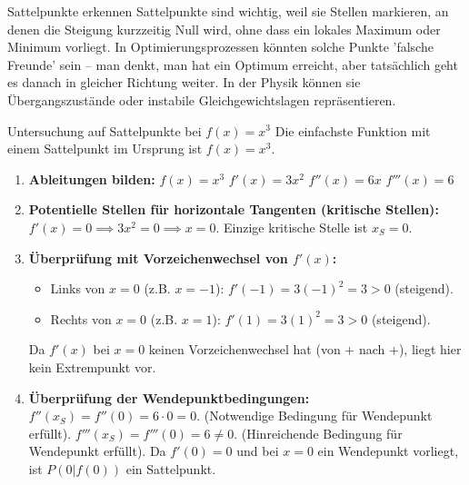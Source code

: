 \begin{warumwichtigumgebung}{Sattelpunkte erkennen}
Sattelpunkte sind wichtig, weil sie Stellen markieren, an denen die Steigung kurzzeitig Null wird, ohne dass ein lokales Maximum oder Minimum vorliegt. In Optimierungsprozessen könnten solche Punkte 'falsche Freunde' sein – man denkt, man hat ein Optimum erreicht, aber tatsächlich geht es danach in gleicher Richtung weiter. In der Physik können sie Übergangszustände oder instabile Gleichgewichtslagen repräsentieren.
\end{warumwichtigumgebung}

\begin{beispielumgebung}{Untersuchung auf Sattelpunkte bei \texorpdfstring{$f(x) = x^3$}{f(x) = x hoch 3}}
Die einfachste Funktion mit einem Sattelpunkt im Ursprung ist $f(x) = x^3$.
\begin{enumerate}
    \item \textbf{Ableitungen bilden:}
        $f(x) = x^3$
        $f'(x) = 3x^2$
        $f''(x) = 6x$
        $f'''(x) = 6$

    \item \textbf{Potentielle Stellen für horizontale Tangenten (kritische Stellen):}
        $f'(x) = 0 \implies 3x^2 = 0 \implies x = 0$.
        Einzige kritische Stelle ist $x_S = 0$.

    \item \textbf{Überprüfung mit Vorzeichenwechsel von $f'(x)$:}
        \begin{itemize}
            \item Links von $x=0$ (z.B. $x=-1$): $f'(-1) = 3(-1)^2 = 3 > 0$ (steigend).
            \item Rechts von $x=0$ (z.B. $x=1$): $f'(1) = 3(1)^2 = 3 > 0$ (steigend).
        \end{itemize}
        Da $f'(x)$ bei $x=0$ keinen Vorzeichenwechsel hat (von $+$ nach $+$), liegt hier kein Extrempunkt vor.

    \item \textbf{Überprüfung der Wendepunktbedingungen:}
        $f''(x_S) = f''(0) = 6 \cdot 0 = 0$. (Notwendige Bedingung für Wendepunkt erfüllt).
        $f'''(x_S) = f'''(0) = 6 \neq 0$. (Hinreichende Bedingung für Wendepunkt erfüllt).
        Da $f'(0)=0$ und bei $x=0$ ein Wendepunkt vorliegt, ist $P(0|f(0))$ ein Sattelpunkt.


\end{enumerate}
\end{beispielumgebung}
